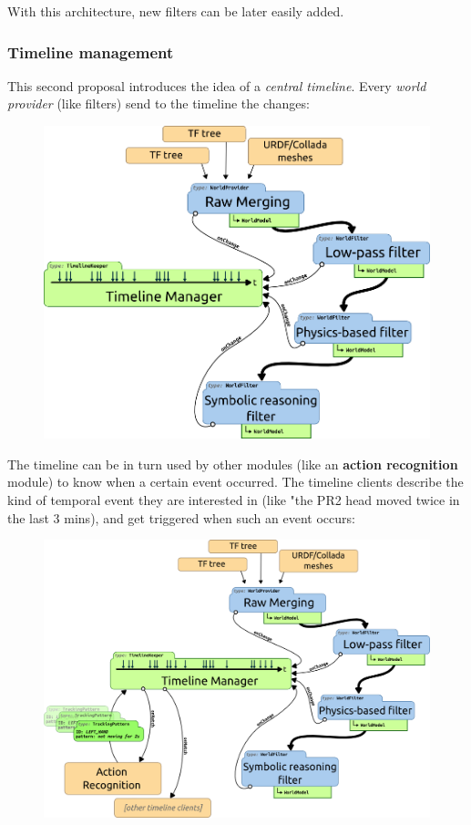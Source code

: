 \documentclass[a4paper]{article}
\begin{document}
With this architecture, new filters can be later easily added.

\FloatBarrier
\subsubsection{Timeline management}

This second proposal introduces the idea of a \emph{central timeline}. Every \emph{world
provider} (like filters) send to the timeline the changes:

\begin{figure}[!h]
    \centering
    \includegraphics[scale=0.5]{images/spark2_archi2_3.png}
\end{figure}

\FloatBarrier
The timeline can be in turn used by other modules (like an \textbf{action
recognition} module) to know when a certain event occurred. The timeline
clients describe the kind of temporal event they are interested in (like "the
PR2 head moved twice in the last 3 mins), and get triggered when such an event
occurs:

\begin{figure}[!h]
    \centering
    \includegraphics[scale=0.5]{images/spark2_archi2_4.png}
\end{figure}
\end{document}
